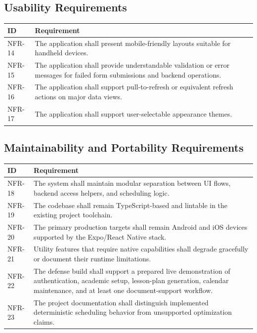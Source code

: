 \documentclass[12pt]{article}
\begin{document}
\subsection{Usability Requirements}

\begin{longtable}{|L{2.3cm}|L{11.3cm}|}
\hline
\textbf{ID} & \textbf{Requirement} \\
\hline
NFR-14 & The application shall present mobile-friendly layouts suitable for handheld devices. \\
\hline
NFR-15 & The application shall provide understandable validation or error messages for failed form submissions and backend operations. \\
\hline
NFR-16 & The application shall support pull-to-refresh or equivalent refresh actions on major data views. \\
\hline
NFR-17 & The application shall support user-selectable appearance themes. \\
\hline
\end{longtable}

\subsection{Maintainability and Portability Requirements}

\begin{longtable}{|L{2.3cm}|L{11.3cm}|}
\hline
\textbf{ID} & \textbf{Requirement} \\
\hline
NFR-18 & The system shall maintain modular separation between UI flows, backend access helpers, and scheduling logic. \\
\hline
NFR-19 & The codebase shall remain TypeScript-based and lintable in the existing project toolchain. \\
\hline
NFR-20 & The primary production targets shall remain Android and iOS devices supported by the Expo/React Native stack. \\
\hline
NFR-21 & Utility features that require native capabilities shall degrade gracefully or document their runtime limitations. \\
\hline
NFR-22 & The defense build shall support a prepared live demonstration of authentication, academic setup, lesson-plan generation, calendar maintenance, and at least one document-support workflow. \\
\hline
NFR-23 & The project documentation shall distinguish implemented deterministic scheduling behavior from unsupported optimization claims. \\
\hline
\end{longtable}
\end{document}
